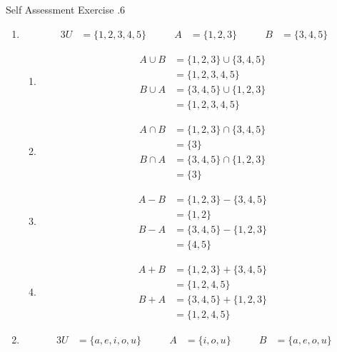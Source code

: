 \documentclass[../notes.tex]{subfiles}
\begin{document}
			\begin{exercise}{Self Assessment Exercise \thechapter.6}
				\begin{enumerate}
					\item \moveup
						\begin{alignat*}{3}
							U &= \{1, 2, 3, 4, 5\} \qquad & A &= \{1, 2, 3\} \qquad & B &= \{3, 4, 5\}
						\end{alignat*}
						\begin{enumerate}[label=(\alph*)]
							\item \moveup
								\begin{align*}
									A \cup B &= \{1, 2, 3\} \cup \{3, 4, 5\}\\
									&= \{1, 2, 3, 4, 5\}\\
									B \cup A &= \{3, 4, 5\} \cup \{1, 2, 3\}\\
									&= \{1, 2, 3, 4, 5\}
								\end{align*}
							\item \moveup
								\begin{align*}
									A \cap B &= \{1, 2, 3\} \cap \{3, 4, 5\}\\
									&= \{3\}\\
									B \cap A &= \{3, 4, 5\} \cap \{1, 2, 3\}\\
									&= \{3\}
								\end{align*}
							\item \moveup
								\begin{align*}
									A - B &= \{1, 2, 3\} - \{3, 4, 5\}\\
									&= \{1, 2\}\\
									B - A &= \{3, 4, 5\} - \{1, 2, 3\}\\
									&= \{4, 5\}
								\end{align*}
							\item \moveup
								\begin{align*}
									A + B &= \{1, 2, 3\} + \{3, 4, 5\}\\
									&= \{1, 2, 4 , 5\}\\
									B + A &= \{3, 4, 5\} + \{1, 2, 3\}\\
									&= \{1, 2, 4, 5\}
								\end{align*}
						\end{enumerate}
					\item \moveup
						\begin{alignat*}{3}
							U &= \{a, e, i, o, u\} \qquad & A &= \{i, o, u\} \qquad & B &= \{a, e, o, u\}
						\end{alignat*}

\end{enumerate}
\end{exercise}
\end{document}
